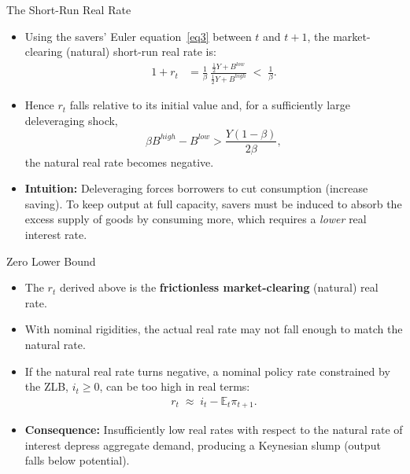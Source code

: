 \documentclass[11pt,aspectratio=169]{beamer}
\newcommand{\E}{\mathbb{E}}
\begin{document}
\begin{frame}{The Short-Run Real Rate}
\small
\begin{itemize}
  \item Using the savers' Euler equation~\eqref{eq3} between $t$ and $t+1$, the market-clearing (natural) short-run real rate is:
  \begin{align*}
    1+r_t
    &= \frac{1}{\beta}\,
       \frac{\frac{1}{2}Y+B^{low}}{\frac{1}{2}Y+B^{high}}
    \;<\;\frac{1}{\beta}.
  \end{align*}
  \item Hence $r_t$ falls relative to its initial value and, for a sufficiently large deleveraging shock,
  \[
    \beta B^{high}-B^{low}>\frac{Y(1-\beta)}{2\beta},
  \]
  the natural real rate becomes negative.
  \vspace{0.3em}
  \item \textbf{Intuition:} Deleveraging forces borrowers to cut consumption (increase saving).  
  To keep output at full capacity, savers must be induced to absorb the excess supply of goods by consuming more, which requires a \emph{lower} real interest rate.
\end{itemize}
\end{frame}

\begin{frame}{Zero Lower Bound}
\small
\begin{itemize}
  \item The $r_t$ derived above is the \textbf{frictionless market-clearing} (natural) real rate.
  \item With nominal rigidities, the actual real rate may not fall enough to match the natural rate.
  \item If the natural real rate turns negative, a nominal policy rate constrained by the ZLB, $i_t\ge 0$, can be too high in real terms:
  \begin{align*}
    r_t \;\approx\; i_t - \E_t\pi_{t+1}.
  \end{align*}
  \item \textbf{Consequence:} Insufficiently low real rates with respect to the natural rate of interest depress aggregate demand, producing a Keynesian slump (output falls below potential).
\end{itemize}
\end{frame}
\end{document}
